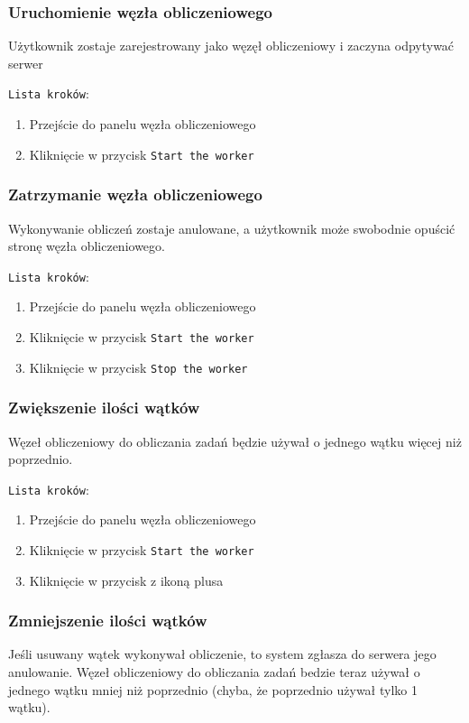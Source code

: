 \documentclass[a4paper,11pt,twoside]{report}
\theoremstyle{definition}
\begin{document}
    		\subsubsection{Uruchomienie węzła obliczeniowego}	
				Użytkownik zostaje zarejestrowany jako węzęł obliczeniowy i zaczyna odpytywać serwer 
				
				\texttt{Lista kroków}:
				\begin{enumerate}
					\item Przejście do panelu węzła obliczeniowego
					\item Kliknięcie w przycisk \texttt{Start the worker}
				\end{enumerate}
		    
        	\subsubsection{Zatrzymanie węzła obliczeniowego}	
    			Wykonywanie obliczeń zostaje anulowane, a użytkownik może swobodnie opuścić stronę węzła obliczeniowego.
    
			    \texttt{Lista kroków}:
			    \begin{enumerate}
					\item Przejście do panelu węzła obliczeniowego
					\item Kliknięcie w przycisk \texttt{Start the worker}
					\item Kliknięcie w przycisk \texttt{Stop the worker}
			    \end{enumerate}

    		\subsubsection{Zwiększenie ilości wątków}	
				Węzeł obliczeniowy do obliczania zadań będzie używał o jednego wątku więcej niż poprzednio. 

				\texttt{Lista kroków}:
				\begin{enumerate}
					\item Przejście do panelu węzła obliczeniowego
					\item Kliknięcie w przycisk \texttt{Start the worker}
					\item Kliknięcie w przycisk z ikoną plusa
				\end{enumerate}

    		\subsubsection{Zmniejszenie ilości wątków}	
				Jeśli usuwany wątek wykonywał obliczenie, to system zgłasza do serwera jego anulowanie. Węzeł obliczeniowy do obliczania zadań bedzie teraz używał o jednego wątku mniej niż poprzednio (chyba, że poprzednio używał tylko 1 wątku).
\end{document}
